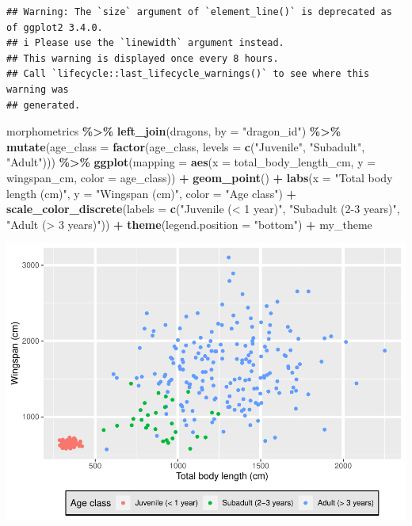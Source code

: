 \documentclass[
]{book}
\newenvironment{Shaded}{\begin{snugshade}}{\end{snugshade}}
\newcommand{\AttributeTok}[1]{\textcolor[rgb]{0.13,0.29,0.53}{#1}}
\newcommand{\FunctionTok}[1]{\textcolor[rgb]{0.13,0.29,0.53}{\textbf{#1}}}
\newcommand{\NormalTok}[1]{#1}
\newcommand{\SpecialCharTok}[1]{\textcolor[rgb]{0.81,0.36,0.00}{\textbf{#1}}}
\newcommand{\StringTok}[1]{\textcolor[rgb]{0.31,0.60,0.02}{#1}}
\begin{document}
\begin{verbatim}
## Warning: The `size` argument of `element_line()` is deprecated as of ggplot2 3.4.0.
## i Please use the `linewidth` argument instead.
## This warning is displayed once every 8 hours.
## Call `lifecycle::last_lifecycle_warnings()` to see where this warning was
## generated.
\end{verbatim}

\begin{Shaded}
\begin{Highlighting}[]
\NormalTok{morphometrics }\SpecialCharTok{\%\textgreater{}\%} 
  \FunctionTok{left\_join}\NormalTok{(dragons, }\AttributeTok{by =} \StringTok{"dragon\_id"}\NormalTok{) }\SpecialCharTok{\%\textgreater{}\%} 
  \FunctionTok{mutate}\NormalTok{(}\AttributeTok{age\_class =} \FunctionTok{factor}\NormalTok{(age\_class, }\AttributeTok{levels =} \FunctionTok{c}\NormalTok{(}\StringTok{"Juvenile"}\NormalTok{,}
                                                  \StringTok{"Subadult"}\NormalTok{,}
                                                  \StringTok{"Adult"}\NormalTok{))) }\SpecialCharTok{\%\textgreater{}\%} 
\FunctionTok{ggplot}\NormalTok{(}\AttributeTok{mapping =} \FunctionTok{aes}\NormalTok{(}\AttributeTok{x =}\NormalTok{ total\_body\_length\_cm, }\AttributeTok{y =}\NormalTok{ wingspan\_cm, }\AttributeTok{color =}\NormalTok{ age\_class)) }\SpecialCharTok{+}
  \FunctionTok{geom\_point}\NormalTok{() }\SpecialCharTok{+}
  \FunctionTok{labs}\NormalTok{(}\AttributeTok{x =} \StringTok{"Total body length (cm)"}\NormalTok{, }\AttributeTok{y =} \StringTok{"Wingspan (cm)"}\NormalTok{, }\AttributeTok{color =} \StringTok{"Age class"}\NormalTok{) }\SpecialCharTok{+}
  \FunctionTok{scale\_color\_discrete}\NormalTok{(}\AttributeTok{labels =} \FunctionTok{c}\NormalTok{(}\StringTok{"Juvenile (\textless{} 1 year)"}\NormalTok{,}
                                 \StringTok{"Subadult (2{-}3 years)"}\NormalTok{,}
                                 \StringTok{"Adult (\textgreater{} 3 years)"}\NormalTok{)) }\SpecialCharTok{+}
  \FunctionTok{theme}\NormalTok{(}\AttributeTok{legend.position =} \StringTok{"bottom"}\NormalTok{) }\SpecialCharTok{+}
\NormalTok{  my\_theme}
\end{Highlighting}
\end{Shaded}

\includegraphics{reproducible-science_files/figure-latex/gg12-1.pdf}
\end{document}
